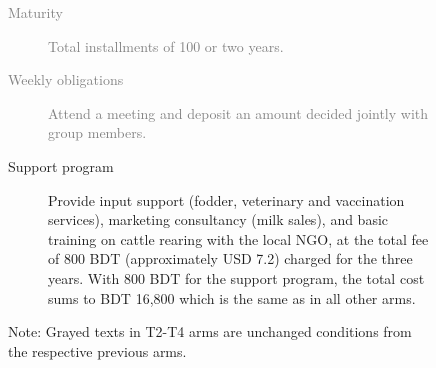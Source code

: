\begin{figure}
{{\begin{description}
\begin{description}
		\item[\textcolor{gray}{Maturity}]	\textcolor{gray}{Total installments of 100 or two years. }
		\item[\textcolor{gray}{Weekly obligations}]	\textcolor{gray}{Attend a meeting and deposit an amount decided jointly with group members.}
		\item[Support program] 	Provide input support (fodder, veterinary and vaccination services), marketing consultancy (milk sales), and basic training on cattle rearing with the local NGO, at the total fee of 800 BDT (approximately USD 7.2) charged for the three years. With 800 BDT for the support program, the total cost sums to BDT 16,800 which is the same as in all other arms.
		\end{description}
	\setlength{\baselineskip}{12pt}
	\end{description}
	}

Note: Grayed texts in \textsf{T2}-\textsf{T4} arms are unchanged conditions from the respective previous arms.
}
\end{figure}

